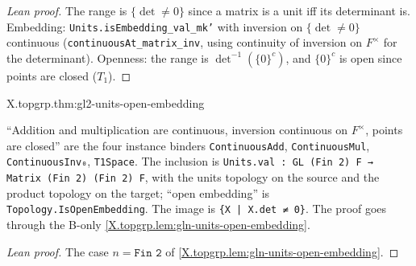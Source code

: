 \begin{proof}[Lean proof]
The range is $\{\det\ne0\}$ since a matrix is a unit iff its determinant is. Embedding: \texttt{Units.isEmbedding\_val\_mk'} with inversion on $\{\det\ne0\}$ continuous (\texttt{continuousAt\_matrix\_inv}, using continuity of inversion on $F^\times$ for the determinant). Openness: the range is $\det^{-1}(\{0\}^c)$, and $\{0\}^c$ is open since points are closed ($T_1$).
\end{proof}

\begin{theorem}
\end{theorem}
\begin{tfformal}{X.topgrp.thm:gl2-units-open-embedding}
\begin{tffidelity}
``Addition and multiplication are continuous, inversion continuous on $F^\times$, points are closed'' are the four instance binders \texttt{ContinuousAdd}, \texttt{ContinuousMul}, \texttt{ContinuousInv₀}, \texttt{T1Space}. The inclusion is \texttt{Units.val : GL (Fin 2) F → Matrix (Fin 2) (Fin 2) F}, with the units topology on the source and the product topology on the target; ``open embedding'' is \texttt{Topology.IsOpenEmbedding}. The image is \texttt{\{X | X.det ≠ 0\}}. The proof goes through the B-only \cref{X.topgrp.lem:gln-units-open-embedding}.
\end{tffidelity}
\end{tfformal}
\begin{proof}[Lean proof]
The case $n=\texttt{Fin 2}$ of \cref{X.topgrp.lem:gln-units-open-embedding}.
\end{proof}

